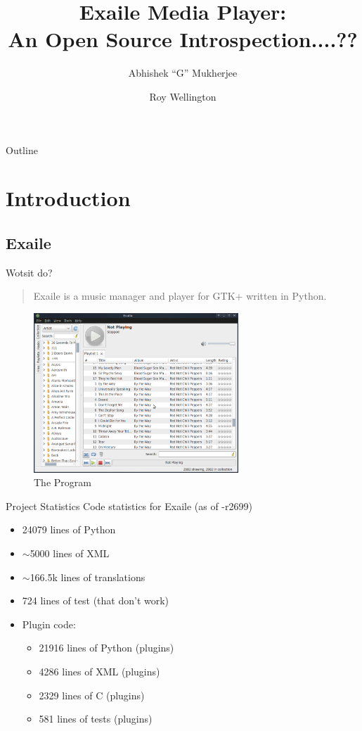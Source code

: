 \documentclass{beamer}
\title
{%
  Exaile Media Player:\\
  An Open Source Introspection....?? %
}
\author
{
  Abhishek ``G'' Mukherjee \and
  Roy Wellington
}
\begin{document}
\lstset{language=Python}

\begin{frame}
  \titlepage
\end{frame}

\begin{frame}{Outline}
  \tableofcontents
\end{frame}


\section{Introduction}

\subsection{Exaile}

\begin{frame}{Wotsit do?}
  \begin{quote}
    Exaile is a music manager and player for GTK+ written in Python.
  \end{quote}
  \begin{figure}
    \includegraphics[height=60mm]{images/exaile}
    \caption{The Program}
  \end{figure}
\end{frame}

\begin{frame}{Project Statistics}
  Code statistics for Exaile (as of -r2699)
  \begin{itemize}
    \item 24079 lines of Python
    \item $\sim$5000 lines of XML
    \item $\sim$166.5k lines of translations
    \item 724 lines of test (that don't work)
	\item Plugin code:
	\begin{itemize}
      \item 21916 lines of Python (plugins)
      \item 4286 lines of XML (plugins)
      \item 2329 lines of C (plugins)
      \item 581 lines of tests (plugins)
	\end{itemize}
  \end{itemize}
\end{frame}
\end{document}
